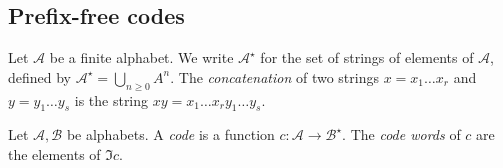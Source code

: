\subsection{Prefix-free codes}
Let \( \mathcal A \) be a finite alphabet.
We write \( \mathcal A^\star \) for the set of strings of elements of \( \mathcal A \), defined by \( \mathcal A^\star = \bigcup_{n \geq 0} A^n \).
The \emph{concatenation} of two strings \( x = x_1 \dots x_r \) and \( y = y_1 \dots y_s \) is the string \( xy = x_1 \dots x_r y_1 \dots y_s \).
\begin{definition}
    Let \( \mathcal A, \mathcal B \) be alphabets.
    A \emph{code} is a function \( c \colon \mathcal A \to \mathcal B^\star \).
    The \emph{code words} of \( c \) are the elements of \( \Im c \).
\end{definition}
